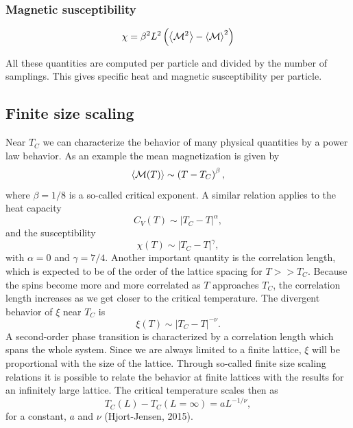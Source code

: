 \documentclass[11pt,a4paper,draft]{article}
\numberwithin{equation}{section}
\newcommand{\magM}{\mathcal{M}}
\begin{document}
\subsubsection{Magnetic susceptibility}
\begin{equation}
\chi = \beta^2 L^2 \left(\expval{\magM^2} - \expval{\magM}^2\right)
\end{equation}

All these quantities are computed per particle and divided by the number 
of samplings. This gives specific heat and magnetic susceptibility 
per particle.

\subsection{Finite size scaling}

Near $T_C$ we can characterize the behavior of many physical quantities
by a power law behavior.
As an example the mean magnetization is given by
\begin{equation}
  \langle {\cal M}(T) \rangle \sim \left(T-T_C\right)^{\beta},
\end{equation}
where $\beta=1/8$ is a so-called critical exponent. A similar relation
applies to the heat capacity 
\begin{equation}
  C_V(T) \sim \left|T_C-T\right|^{\alpha},
\end{equation}
and the susceptibility
\begin{equation}
  \chi(T) \sim \left|T_C-T\right|^{\gamma},
\end{equation}
with $\alpha = 0$ and $\gamma = 7/4$.
Another important quantity is the correlation length, which is expected
to be of the order of the lattice spacing for $T>> T_C$. Because the spins
become more and more correlated as $T$ approaches $T_C$, the correlation
length increases as we get closer to the critical temperature. The divergent
behavior of $\xi$ near $T_C$ 
is
\begin{equation}
  \xi(T) \sim \left|T_C-T\right|^{-\nu}.
  \label{eq:xi}
\end{equation}
A second-order phase transition is characterized by a
correlation length which spans the whole system.
Since we are always limited to a finite lattice, $\xi$ will
be proportional with the size of the lattice. 
Through so-called finite size scaling relations
it is possible to relate the behavior at finite lattices with the 
results for an infinitely large lattice.
The critical temperature scales then as
\begin{equation}
 T_C(L)-T_C(L=\infty) = aL^{-1/\nu},
 \label{eq:tc}
\end{equation}
for a constant, $a$ and  $\nu$ (Hjort-Jensen, 2015). 
\end{document}
